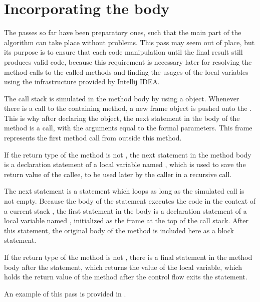 \section{Incorporating the body}

The passes so far have been preparatory ones, such that the main part of the algorithm can take place without problems.
This pass may seem out of place, but its purpose is to ensure that each code manipulation until the final result still
produces valid code, because this requirement is necessary later for resolving the method calls to the called methods
and finding the usages of the local variables using the infrastructure provided by Intellij IDEA.

The call stack is simulated in the method body by using a  object. Whenever there is a call to the
containing method, a new frame object is pushed onto the . This is why after declaring the 
object, the next statement in the body of the method is a  call, with the arguments equal to the formal
parameters. This frame represents the first method call from outside this method.

If the return type of the method is not , the next statement in the method body is a declaration
statement of a local variable named , which is used to save the return value of the callee, to be used
later by the caller in a recursive call.

The next statement is a  statement which loops as long as the simulated call  is not empty.
Because the body of the statement executes the code in the context of a current stack ,
the first statement in the  body is a declaration statement of a local variable named ,
initialized as the frame at the top of the call stack. After this statement, the original body of the method is
included here as a block statement.

If the return type of the method is not , there is a final  statement in the method body
after the  statement, which returns the value of the  local variable, which holds the
return value of the method after the control flow exits the  statement.

An example of this pass is provided in .

